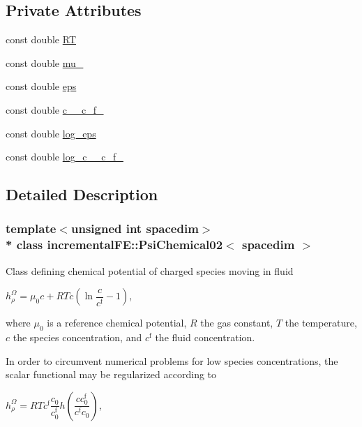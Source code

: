 \subsection*{Private Attributes}
\begin{DoxyCompactItemize}
\item 
const double \hyperlink{classincremental_f_e_1_1_psi_chemical02_a4b93e968af97d8497a53be13980ef22e}{RT}
\item 
const double \hyperlink{classincremental_f_e_1_1_psi_chemical02_a70426dc3fa6acda53984c2e178ad92c5}{mu\+\_}
\item 
const double \hyperlink{classincremental_f_e_1_1_psi_chemical02_a1062004f111d9b425c16e3e3c1c4ce20}{eps}
\item 
const double \hyperlink{classincremental_f_e_1_1_psi_chemical02_aa2b9c1f2f65985cd003d9e33a5e54875}{c\+\_\+\_\+c\+\_\+f\+\_}
\item 
const double \hyperlink{classincremental_f_e_1_1_psi_chemical02_a37ddfb3a86936177344fafd95f8eb377}{log\+\_\+eps}
\item 
const double \hyperlink{classincremental_f_e_1_1_psi_chemical02_a35ebf4f4790fd12b1660146f2714704a}{log\+\_\+c\+\_\+\_\+c\+\_\+f\+\_}
\end{DoxyCompactItemize}


\subsection{Detailed Description}
\subsubsection*{template$<$unsigned int spacedim$>$\\*
class incremental\+F\+E\+::\+Psi\+Chemical02$<$ spacedim $>$}

Class defining chemical potential of charged species moving in fluid

$h^\Omega_\rho = \mu_0 c + RT c \left( \ln\dfrac{c}{c^\mathrm{f}} - 1 \right)$,

where $\mu_0$ is a reference chemical potential, $R$ the gas constant, $T$ the temperature, $c$ the species concentration, and $c^\mathrm{f}$ the fluid concentration.

In order to circumvent numerical problems for low species concentrations, the scalar functional may be regularized according to

$h^\Omega_\rho = RT c^\mathrm{f} \dfrac{c_0}{c^\mathrm{f}_0} h\left( \dfrac{c c^\mathrm{f}_0}{c^\mathrm{f} c_0} \right)$,


